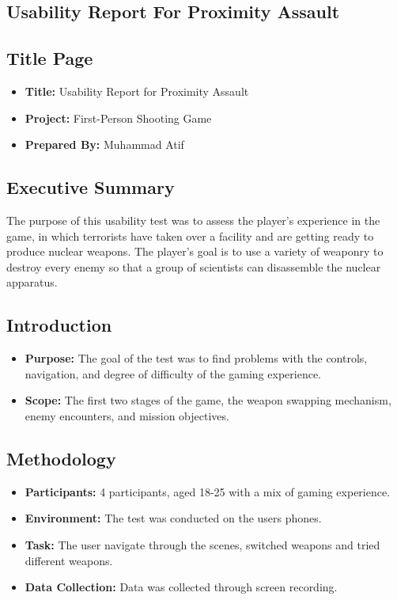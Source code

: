\subsection{Usability Report For Proximity Assault}
	\subsection{Title Page}
	\begin{itemize}
		\item \textbf{Title:} Usability Report for Proximity Assault
		\item \textbf{Project:} First-Person Shooting Game
		\item \textbf{Prepared By:} Muhammad Atif
	\end{itemize}
	\subsection{Executive Summary}
	The purpose of this usability test was to assess the player's experience in the game, in which terrorists have taken over a facility and are getting ready to produce nuclear weapons. The player's goal is to use a variety of weaponry to destroy every enemy so that a group of scientists can disassemble the nuclear apparatus.
	\subsection{Introduction}
	\begin{itemize}
		\item \textbf{Purpose:} The goal of the test was to find problems with the controls, navigation, and degree of difficulty of the gaming experience.
		\item \textbf{Scope:} The first two stages of the game, the weapon swapping mechanism, enemy encounters, and mission objectives.
	\end{itemize}
	\subsection{Methodology}
	\begin{itemize}
		\item \textbf{Participants:} 4 participants, aged 18-25 with a mix of gaming experience.
		\item \textbf{Environment:} The test was conducted on the users phones.
		\item \textbf{Task:} The user navigate through the scenes, switched weapons and tried different weapons.
		\item \textbf{Data Collection:} Data was collected through screen recording.
	\end{itemize}
